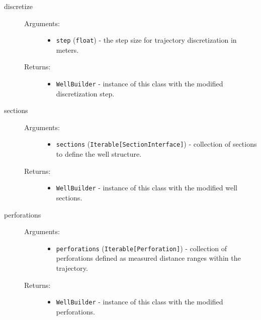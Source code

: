\documentclass[english,10pt,a4paper]{article}
\begin{document}
\begin{description}
		\item[ \colorbox{gray!20}{discretize}] \hfill
		\begin{description}
			\item[Arguments:] \hfill
			\begin{itemize}
				\item \texttt{step} (\texttt{float}) - the step size for trajectory discretization in meters.
			\end{itemize}
			\item[Returns:] \hfill
			\begin{itemize}
				\item \texttt{WellBuilder} - instance of this class with the modified discretization step.
			\end{itemize}
		\end{description}

		\item[ \colorbox{gray!20}{sections}] \hfill
		\begin{description}
			\item[Arguments:] \hfill
			\begin{itemize}
				\item \texttt{sections} (\texttt{Iterable[SectionInterface]}) - collection of sections to define the well structure.
			\end{itemize}
			\item[Returns:] \hfill
			\begin{itemize}
				\item \texttt{WellBuilder} - instance of this class with the modified well sections.
			\end{itemize}
		\end{description}

		\item[ \colorbox{gray!20}{perforations}] \hfill
		\begin{description}
			\item[Arguments:] \hfill
			\begin{itemize}
				\item \texttt{perforations} (\texttt{Iterable[Perforation]}) - collection of perforations defined as measured distance ranges within the trajectory.
			\end{itemize}
			\item[Returns:] \hfill
			\begin{itemize}
				\item \texttt{WellBuilder} - instance of this class with the modified perforations.
			\end{itemize}
		\end{description}


\end{description}
\end{document}
